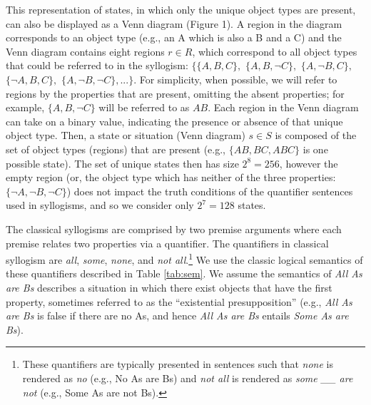 \documentclass[floatsintext, man]{apa6}
\begin{document}
This representation of states, in which only the unique object types are present, can also be displayed as a Venn diagram (Figure 1).
A region in the diagram corresponds to an object type (e.g., an A which is also a B and a C) and the Venn diagram contains eight regions $r \in R$, which correspond to all object types that could be referred to in the syllogism: $\{\{A,B,C\},$ $\{A,B,\neg C\},$ $\{A,\neg B,C\},$ $\{\neg A, B, C\},$ $\{A, \neg B, \neg C\},...\}$. For simplicity, when possible, we will refer to regions by the properties that are present, omitting the absent properties; for example, $\{A, B, \neg C\}$ will be referred to as $AB$.
Each region in the Venn diagram can take on a binary value, indicating the presence or absence of that unique object type.
Then, a state or situation (Venn diagram) $s \in S$ is composed of the set of object types (regions) that are present (e.g., $\{AB, BC, ABC\}$ is one possible state).
The set of unique states then has size $2^8 = 256$, however the empty region (or, the object type which has neither of the three properties: $\{\neg A, \neg B, \neg C\}$) does not impact the truth conditions of the quantifier sentences used in syllogisms, and so we consider only $2^7 = 128$ states.




The classical syllogisms are comprised by two premise arguments where each premise relates two properties via a quantifier. 
The quantifiers in classical syllogism are \emph{all}, \emph{some}, \emph{none}, and \emph{not all}.\footnote{
These quantifiers are typically presented in sentences such that \emph{none} is rendered as \emph{no} (e.g., No As are Bs) and \emph{not all} is rendered as \emph{some \_\_ are not} (e.g., Some As are not Bs).
}
We use the classic logical semantics of these quantifiers described in Table \ref{tab:sem}.
We assume the semantics of \emph{All As are Bs} describes a situation in which there exist objects that have the first property, sometimes referred to as the ``existential presupposition'' (e.g., \emph{All As are Bs} is false if there are no As, and hence \emph{All As are Bs} entails \emph{Some As are Bs}). 
\end{document}
